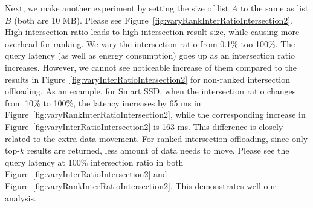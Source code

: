 Next, we make another experiment by setting the size of list $A$ to the same as list $B$ (both are 10 MB). Please see Figure~\ref{fig:varyRankInterRatioIntersection2}. High intersection ratio leads to high intersection result size, while causing more overhead for ranking. We vary the intersection ratio from 0.1\% too 100\%.
The query latency (as well as energy consumption) goes up as an intersection ratio increases. However, we cannot see noticeable increase of them compared to the results in Figure~\ref{fig:varyInterRatioIntersection2} for non-ranked intersection offloading. As an example, for Smart SSD, when the intersection ratio changes from 10\% to 100\%, the latency increases by 65 ms in Figure~\ref{fig:varyRankInterRatioIntersection2}, while the corresponding increase in Figure~\ref{fig:varyInterRatioIntersection2} is 163 ms. 
This difference is closely related to the extra data movement. For ranked intersection offloading, since only top-$k$ results are returned, less amount of data needs to move. Please see the query latency at 100\% intersection ratio in both Figure~\ref{fig:varyInterRatioIntersection2} and Figure~\ref{fig:varyRankInterRatioIntersection2}. This demonstrates well our analysis.




